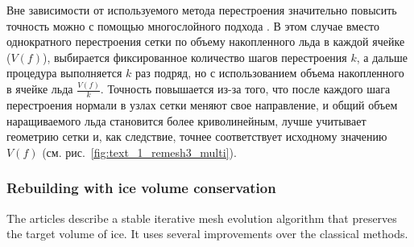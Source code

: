 Вне зависимости от используемого метода перестроения значительно повысить точность можно с помощью многослойного подхода \cite{BourgaultCote2017}.
В этом случае вместо однократного перестроения сетки по объему накопленного льда в каждой ячейке ($V(f)$), выбирается фиксированное количество шагов перестроения $k$, а дальше процедура выполняется $k$ раз подряд, но с использованием объема накопленного в ячейке льда $\frac{V(f)}{k}$.
Точность повышается из-за того, что после каждого шага перестроения нормали в узлах сетки меняют свое направление, и общий объем наращиваемого льда становится более криволинейным, лучше учитывает геометрию сетки и, как следствие, точнее соответствует исходному значению $V(f)$ (см. рис.~\ref{fig:text_1_remesh3_multi}).

\subsubsection{Rebuilding with ice volume conservation}

The articles \cite{Thompson,Tong} describe a stable iterative mesh evolution algorithm that preserves the target volume of ice.
It uses several improvements over the classical methods.


